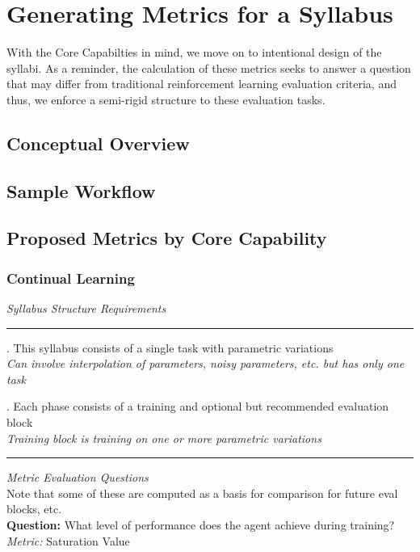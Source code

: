 \chapter{Generating Metrics for a Syllabus}\label{ch:metrics_syllabus}

With the Core Capabilties in mind, we move on to intentional design of the syllabi. As a reminder, the calculation of these metrics seeks to answer a question that may differ from traditional reinforcement learning evaluation criteria, and thus, we enforce a semi-rigid structure to these evaluation tasks.

\section{Conceptual Overview}

\section{Sample Workflow}
    
\section{Proposed Metrics by Core Capability}

\subsection*{Continual Learning} 
\textit{Syllabus Structure Requirements}\\
\noindent\rule{8cm}{0.4pt}
. This syllabus consists of a single task with parametric variations\\
\textit{Can involve interpolation of parameters, noisy parameters, etc. but has only one task \\}


. Each phase consists of a training and optional but recommended evaluation block\\
\textit{Training block is training on one or more parametric variations \\}
\noindent\rule{8cm}{0.4pt}

\flushleft\textit{Metric Evaluation Questions}\\[0.1in]

Note that some of these are computed as a basis for comparison for future eval blocks, etc.\\[0.1in]

\textbf{Question:} What level of performance does the agent achieve during training?\\
\textit{Metric:} Saturation Value\\[0.1in]


